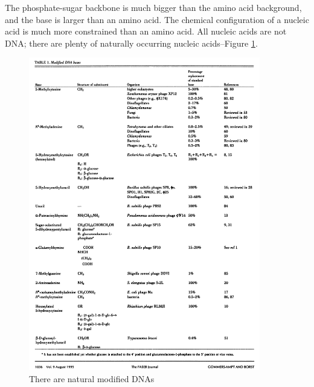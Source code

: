 \documentclass[]{article}
\begin{document}
The phosphate-sugar backbone is much bigger than the amino acid background, and the base is larger than an amino acid. The chemical configuration of a nucleic acid is much more constrained than an amino acid. All nucleic acids are not DNA; there are plenty of naturally occurring nucleic acids--Figure \ref{fig:NaturalxNA}.
\begin{figure}[H]
	\caption{There are natural modified DNAs} \label{fig:NaturalxNA} 
	\includegraphics[width=0.9\textwidth]{NaturalxNA}
\end{figure}
\end{document}
